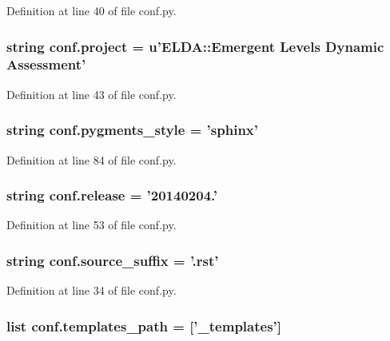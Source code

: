 Definition at line 40 of file conf.\+py.

\hypertarget{a00134_a45653c983098153b78e33600e39230eb}{
\subsubsection[{project}]{\setlength{\rightskip}{0pt plus 5cm}string conf.\+project = u'E\+L\+D\+A\+::\+Emergent Levels Dynamic Assessment'}}\label{a00134_a45653c983098153b78e33600e39230eb}


Definition at line 43 of file conf.\+py.

\hypertarget{a00134_a641130e096b26cba8a5d63ed38684de7}{
\subsubsection[{pygments\+\_\+style}]{\setlength{\rightskip}{0pt plus 5cm}string conf.\+pygments\+\_\+style = 'sphinx'}}\label{a00134_a641130e096b26cba8a5d63ed38684de7}


Definition at line 84 of file conf.\+py.

\hypertarget{a00134_a325dc746d8bf05c54d26351c35a21d90}{
\subsubsection[{release}]{\setlength{\rightskip}{0pt plus 5cm}string conf.\+release = '20140204.'}}\label{a00134_a325dc746d8bf05c54d26351c35a21d90}


Definition at line 53 of file conf.\+py.

\hypertarget{a00134_a10af2a769eb3bd3322e874f677e435b1}{
\subsubsection[{source\+\_\+suffix}]{\setlength{\rightskip}{0pt plus 5cm}string conf.\+source\+\_\+suffix = '.rst'}}\label{a00134_a10af2a769eb3bd3322e874f677e435b1}


Definition at line 34 of file conf.\+py.

\hypertarget{a00134_ae850ae634911b713e036b43894fdd525}{
\subsubsection[{templates\+\_\+path}]{\setlength{\rightskip}{0pt plus 5cm}list conf.\+templates\+\_\+path = \mbox{[}'\+\_\+templates'\mbox{]}}}\label{a00134_ae850ae634911b713e036b43894fdd525}


